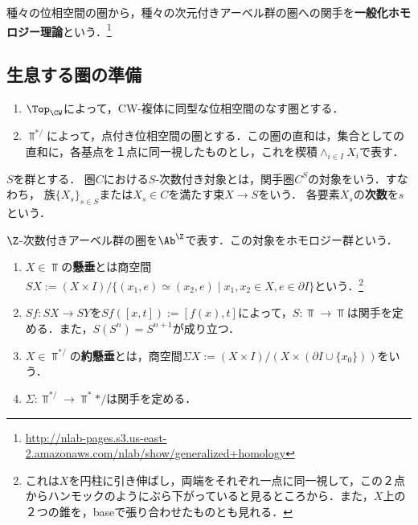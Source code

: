 \documentclass[uplatex, dvipdfmx]{jsreport}
\begin{document}
\begin{tcolorbox}[colframe=ForestGreen, colback=ForestGreen!10!white,breakable,colbacktitle=ForestGreen!40!white,coltitle=black,fonttitle=\bfseries\sffamily,
title=]
    種々の位相空間の圏から，種々の次元付きアーベル群の圏への関手を\textbf{一般化ホモロジー理論}という．\footnote{\url{http://nlab-pages.s3.us-east-2.amazonaws.com/nlab/show/generalized+homology}}
\end{tcolorbox}

\subsection{生息する圏の準備}

\begin{notation}\mbox{}
    \begin{enumerate}
        \item $\Top_\CW$によって，CW-複体に同型な位相空間のなす圏とする．
        \item $\Top^{*/}$によって，点付き位相空間の圏とする．この圏の直和は，集合としての直和に，各基点を１点に同一視したものとし，これを楔積$\wedge_{i\in I}X_i$で表す．
    \end{enumerate}
\end{notation}

\begin{definition}
    $S$を群とする．
    圏$C$における$S$-次数付き対象とは，関手圏$C^S$の対象をいう．すなわち，
    族$\{X_s\}_{s\in S}$または$X_s\in C$を満たす束$X\to S$をいう．
    各要素$X_s$の\textbf{次数}を$s$という．
\end{definition}
\begin{example}
    $\Z$-次数付きアーベル群の圏を$\Ab^\Z$で表す．この対象をホモロジー群という．
\end{example}

\begin{definition}\mbox{}\label{def-suspension}
    \begin{enumerate}
        \item $X\in\Top$の\textbf{懸垂}とは商空間$SX:=(X\times I)/\{(x_1,e)\simeq(x_2,e)\mid x_1,x_2\in X,e\in\partial I\}$という．\footnote{これは$X$を円柱に引き伸ばし，両端をそれぞれ一点に同一視して，この２点からハンモックのようにぶら下がっていると見るところから．また，$X$上の２つの錐を，baseで張り合わせたものとも見れる．}
        \item $Sf:SX\to SY$を$Sf([x,t]):=[f(x),t]$によって，$S:\Top\to\Top$は関手を定める．また，$S(S^n)=S^{n+1}$が成り立つ．
        \item $X\in\Top^{*/}$の\textbf{約懸垂}とは，商空間$\Sigma X:=(X\times I)/(X\times(\partial I\cup\{x_0\}))$をいう．
        \item $\Sigma:\Top^{*/}\to\Top^*{*/}$は関手を定める．
    \end{enumerate}
\end{definition}
\end{document}
